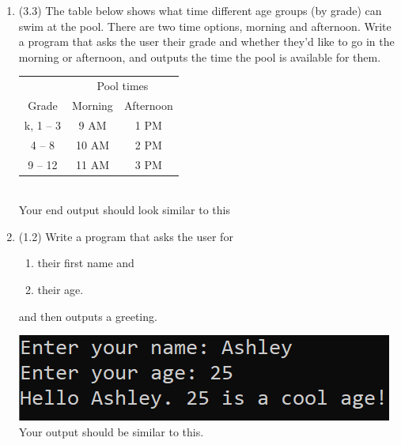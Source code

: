 \documentclass{article}
\begin{document}
\begin{enumerate}

\item (3.3)  
		The table below shows what time different age groups (by grade) can swim at the pool.  There 
		are two time options, morning and afternoon.  Write a program that asks the user their grade 
		and whether they'd like to go in the morning or afternoon, and outputs the time the pool is 
		available for them.

		\begin{minipage}{.45\textwidth}
		\begin{tabular}{c|cc}
						& \multicolumn{2}{c}{Pool times}\\
			Grade 		& Morning 	& Afternoon \\ \hline
			k, 1 -- 3 	& 9 AM 		& 1 PM\\
			4 -- 8 		& 10 AM 	& 2 PM\\
			9 -- 12 	& 11 AM 	& 3 PM \\
		\end{tabular}
		\end{minipage}
		\begin{minipage}{.45\textwidth}
			\ \\
			Your end output should look similar to this

		\end{minipage}











\item (1.2) Write a program that asks the user for \\
		\begin{minipage}{0.5\textwidth}
		\vspace*{-0.5em}
			\begin{enumerate}  \setlength\itemsep{-0.3em}
				\item their first name and
				\item their age.  
			\end{enumerate} \vspace*{-1ex}
		and then outputs a greeting.
		\end{minipage}
		\begin{minipage}{0.5\textwidth}
			\centering
			\includegraphics[scale=0.95]{./imgs/outputGreetingWithAge.png}\\
			Your output should be similar to this.
		\end{minipage}





\end{enumerate}
\end{document}
